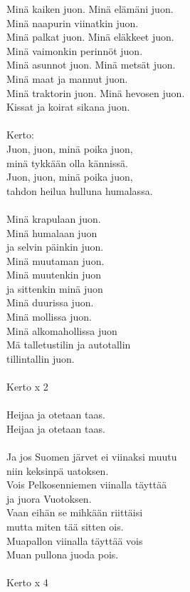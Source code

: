
Minä kaiken juon. Minä elämäni juon. \\ Minä naapurin viinatkin juon. \\ Minä palkat juon. Minä eläkkeet juon. \\ Minä vaimonkin perinnöt juon. \\ Minä asunnot juon. Minä metsät juon. \\ Minä maat ja mannut juon. \\ Minä traktorin juon. Minä hevosen juon. \\ Kissat ja koirat sikana juon. \\ \hspace{10mm} \\ Kerto: \\ Juon, juon, minä poika juon, \\ minä tykkään olla kännissä. \\ Juon, juon, minä poika juon, \\ tahdon heilua hulluna humalassa. \\ \hspace{10mm} \\ Minä krapulaan juon. \\ Minä humalaan juon \\ ja selvin päinkin juon. \\ Minä muutaman juon. \\ Minä muutenkin juon \\ ja sittenkin minä juon \\ Minä duurissa juon. \\ Minä mollissa juon. \\ Minä alkomahollissa juon \\ Mä talletustilin ja autotallin \\ tillintallin juon. \\ \hspace{10mm} \\ Kerto x 2 \\ \hspace{10mm} \\ Heijaa ja otetaan taas. \\ Heijaa ja otetaan taas. \\ \hspace{10mm} \\ Ja jos Suomen järvet ei viinaksi muutu \\ niin keksinpä uatoksen. \\ Vois Pelkosenniemen viinalla täyttää \\ ja juora Vuotoksen. \\ Vaan eihän se mihkään riittäisi \\ mutta miten tää sitten ois. \\ Muapallon viinalla täyttää vois \\ Muan pullona juoda pois. \\ \hspace{10mm} \\ Kerto x 4